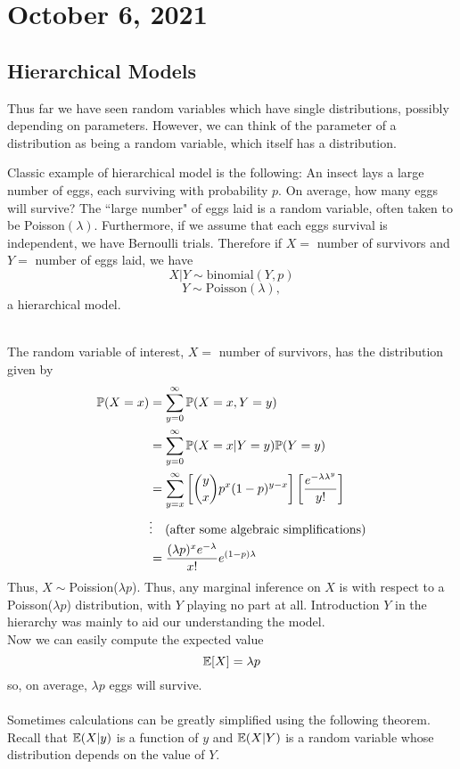 \section{October 6, 2021}
\subsection{Hierarchical Models}
Thus far we have seen random variables which have single distributions, possibly depending on parameters. However, we can think of the parameter of a distribution as being a random variable, which itself has a distribution. 

\begin{example}
Classic example of  hierarchical model is the following: An insect lays a large number of eggs, each surviving with probability $p$. On average, how many eggs will survive? 
The ``large number" of eggs laid is a random variable, often taken to be Poisson$(\lambda)$. Furthermore, if we assume that each eggs survival is independent, we have Bernoulli trials. Therefore if $X =$ number of survivors and $Y=$ number of eggs laid, we have
$$
X|Y \sim \text{binomial}(Y,p)
$$
$$
Y \sim \text{Poisson}(\lambda),
$$
a hierarchical model.
\end{example}
\\
The random variable of interest, $X =$ number of survivors, has the distribution given by
\begin{align*}
    \mathbb P(X=x) &= \sum_{y=0}^{\infty} \mathbb P(X=x,Y=y) \\
             &= \sum_{y=0}^{\infty} \mathbb P(X=x|Y=y) \mathbb P(Y=y) \\
             &= \sum_{y=x}^{\infty} \left[\binom{y}{x}p^x(1-p)^{y-x} \right] \left[ \frac{e^{-\lambda \lambda^y}}{y!} \right] \\
             & \vdots \quad \text{(after some algebraic simplifications)} \\ 
             &= \frac{(\lambda p)^x e^{- \lambda}}{x!} e^{(1-p) \lambda}
\end{align*}
Thus, $X \sim$Poission($\lambda p$). Thus, any marginal inference on $X$ is with respect to a Poisson($\lambda p$) distribution, with $Y$ playing no part at all. Introduction $Y$ in the hierarchy was mainly to aid our understanding the model. 
\\
Now we can easily compute the expected value
$$
\mathbb E[X]= \lambda p
$$
so, on average, $\lambda p$ eggs will survive. 
\\
\\
Sometimes calculations can be greatly simplified using the following theorem. Recall that $\mathbb E(X|y)$ is a function of $y$ and $\mathbb E(X|Y)$ is a random variable whose distribution depends on the value of $Y$.

\begin{theorem}

\end{theorem}